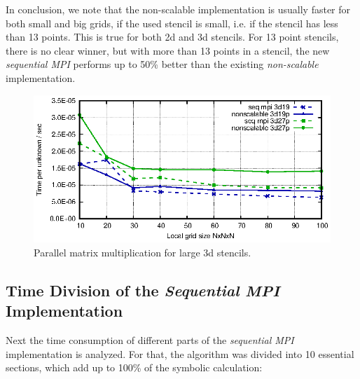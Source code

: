 In conclusion, we note that the non-scalable implementation is usually faster for both small and big grids, if the used stencil is small, i.e. if the stencil has less than 13 points. This is true for both 2d and 3d stencils. For 13 point stencils, there is no clear winner, but with more than 13 points in a stencil, the new \textit{sequential MPI} performs up to 50\% better than the existing \textit{non-scalable} implementation.

\begin{figure}[tbp]
	\centering
	\vspace*{-2.5mm}\includegraphics[width=1\textwidth]{times_3dlarge}
	\caption{Parallel matrix multiplication for large 3d stencils.} 
	\label{fig:mat_ex_test_ex2_times_3dlarge}
\end{figure}

\subsection{Time Division of the \textit{Sequential MPI} Implementation}

Next the time consumption of different parts of the \textit{sequential MPI} implementation is analyzed. For that, the algorithm was divided into 10 essential sections, which add up to 100\% of the symbolic calculation:

